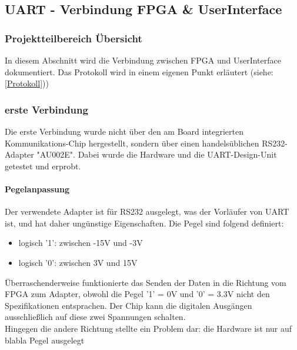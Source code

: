 \subsection{UART - Verbindung FPGA \& UserInterface}
\subsubsection{Projektteilbereich Übersicht}
In diesem Abschnitt wird die Verbindung zwischen FPGA und UserInterface dokumentiert. Das Protokoll wird in einem eigenen Punkt erläutert  (siehe: \ref{Protokoll}))
\subsubsection{erste Verbindung}
Die erste Verbindung wurde nicht über den am Board integrierten Kommunikations-Chip hergestellt, sondern über einen handelsüblichen RS232-Adapter "AU002E". Dabei wurde die Hardware und die UART-Design-Unit getestet und erprobt. 
\paragraph{Pegelanpassung}
Der verwendete Adapter ist für RS232 ausgelegt, was der Vorläufer von UART ist, und hat daher ungünstige Eigenschaften. Die Pegel sind folgend definiert:
\begin{itemize}
	\item
	logisch '1': zwischen -15V und -3V
	\item
	logisch '0': zwischen 3V und 15V
\end{itemize}
Überraschenderweise funktionierte das Senden der Daten in die Richtung vom FPGA zum Adapter, obwohl die Pegel '1' = 0V und '0' = 3.3V nicht den Spezifikationen entsprachen. Der Chip kann die digitalen Ausgängen ausschließlich auf diese zwei Spannungen schalten.\\Hingegen die andere Richtung stellte ein Problem dar: die Hardware ist nur auf blabla Pegel ausgelegt
